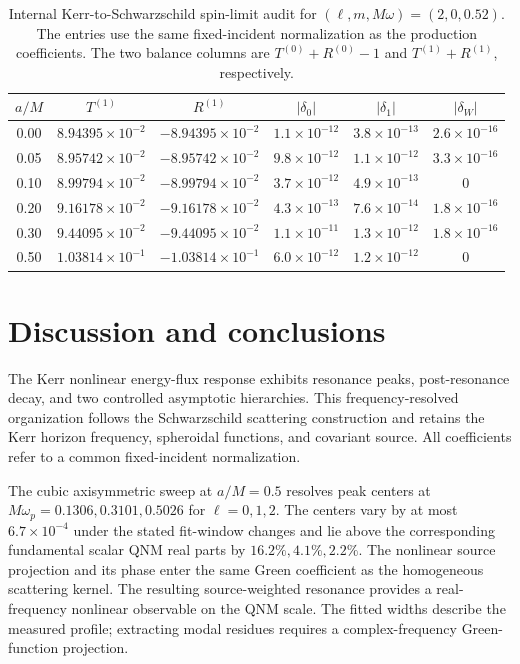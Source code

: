 \documentclass[aps,prd,twocolumn,10pt,nofootinbib,superscriptaddress,floatfix]{revtex4-2}
\begin{document}
\begin{table}[t]
\caption{Internal Kerr-to-Schwarzschild spin-limit audit for
$(\ell,m,M\omega)=(2,0,0.52)$.  The entries use the same fixed-incident
normalization as the production coefficients.  The two balance columns are
$T^{(0)}+R^{(0)}-1$ and $T^{(1)}+R^{(1)}$, respectively.}
\label{tab:spin-limit}
\begin{ruledtabular}
\begin{tabular}{c c c c c c}
$a/M$ & $T^{(1)}$ & $R^{(1)}$ & $|\delta_0|$ & $|\delta_1|$ & $|\delta_W|$\\
\hline
0.00 & $8.94395\times10^{-2}$ & $-8.94395\times10^{-2}$ & $1.1\times10^{-12}$ & $3.8\times10^{-13}$ & $2.6\times10^{-16}$\\
0.05 & $8.95742\times10^{-2}$ & $-8.95742\times10^{-2}$ & $9.8\times10^{-12}$ & $1.1\times10^{-12}$ & $3.3\times10^{-16}$\\
0.10 & $8.99794\times10^{-2}$ & $-8.99794\times10^{-2}$ & $3.7\times10^{-12}$ & $4.9\times10^{-13}$ & $0$\\
0.20 & $9.16178\times10^{-2}$ & $-9.16178\times10^{-2}$ & $4.3\times10^{-13}$ & $7.6\times10^{-14}$ & $1.8\times10^{-16}$\\
0.30 & $9.44095\times10^{-2}$ & $-9.44095\times10^{-2}$ & $1.1\times10^{-11}$ & $1.3\times10^{-12}$ & $1.8\times10^{-16}$\\
0.50 & $1.03814\times10^{-1}$ & $-1.03814\times10^{-1}$ & $6.0\times10^{-12}$ & $1.2\times10^{-12}$ & $0$\\
\end{tabular}
\end{ruledtabular}
\end{table}

\section{Discussion and conclusions}

The Kerr nonlinear energy-flux response exhibits resonance peaks,
post-resonance decay, and two controlled asymptotic hierarchies.  This
frequency-resolved organization follows the Schwarzschild scattering
construction and retains the Kerr horizon frequency, spheroidal functions,
and covariant source.  All coefficients refer to a common fixed-incident
normalization.

The cubic axisymmetric sweep at $a/M=0.5$ resolves peak centers at
$M\omega_p=0.1306,0.3101,0.5026$ for $\ell=0,1,2$.
The centers vary by at most $6.7\times10^{-4}$ under the stated fit-window
changes and lie above the corresponding fundamental scalar QNM real
parts by $16.2\%,4.1\%,2.2\%$.
The nonlinear source projection and its phase enter the same Green
coefficient as the homogeneous scattering kernel.  The resulting
source-weighted resonance provides a real-frequency nonlinear observable
on the QNM scale.  The fitted widths describe the measured profile;
extracting modal residues requires a complex-frequency Green-function
projection.
\end{document}
